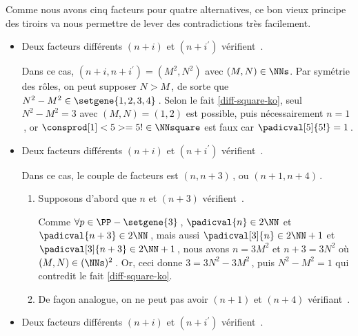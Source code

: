 Comme nous avons cinq facteurs pour quatre alternatives, ce bon vieux principe des tiroirs va nous permettre de lever des contradictions très facilement.
%
\begin{itemize}
	\medskip
	\item Deux facteurs différents $(n+i)$ et $(n+i^\prime)$ vérifient \,.
		
	\smallskip
	\noindent
	Dans ce cas, $(n+i, n+i^\prime) = (M^2, N^2)$ avec $(M, N) \in \NNs$.
	Par symétrie des rôles, on peut supposer $N > M$\,, de sorte que $N^2 - M^2 \in \setgene{1, 2, 3, 4}$\,. 
	Selon le fait \ref{diff-square-ko}, seul $N^2 - M^2 = 3$ avec $(M, N) = (1, 2)$ est possible, puis nécessairement $n = 1$\,, or $\consprod[1]<5> = 5 ! \in \NNsquare$ est faux car $\padicval[5]{5!} = 1$\,.
		
		


	\medskip
	\item Deux facteurs différents $(n+i)$ et $(n+i^\prime)$ vérifient \,.
		
	\smallskip
	\noindent
	Dans ce cas, le couple de facteurs est $(n, n + 3)$\,, ou $(n + 1, n + 4)$\,.    
	\begin{enumerate}
		\item Supposons d'abord que $n$ et $(n+3)$ vérifient \,.
			
		\noindent
		Comme $\forall p \in \PP - \setgene{3}$\,, $\padicval{n} \in 2 \NN$ et $\padicval{n + 3} \in 2 \NN$\,,
		mais aussi $\padicval[3]{n} \in 2 \NN + 1$ et $\padicval[3]{n + 3} \in 2 \NN + 1$\,,
		nous avons $n = 3 M^2$ et $n+3 = 3 N^2$ où $(M, N) \in ( \NNs )^2$\,.
		Or, ceci donne $3 = 3 N^2 - 3 M^2$\,, puis $N^2 - M^2 = 1$ qui contredit le fait \ref{diff-square-ko}.

		\item De façon analogue, on ne peut pas avoir $(n+1)$ et $(n+4)$ vérifiant \,.
	\end{enumerate}


	\medskip
	\item Deux facteurs différents $(n+i)$ et $(n+i^\prime)$ vérifient \,.
		

\end{itemize}
